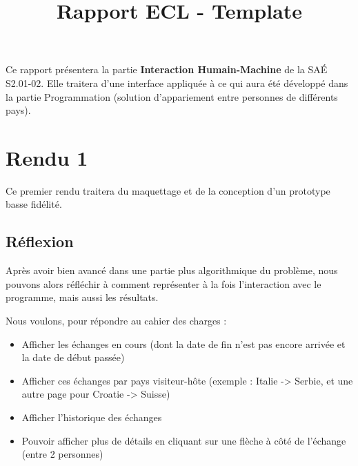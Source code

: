 \documentclass{mytex}
\title{Rapport ECL - Template} %
\begin{document}




        
\fairemarges %
\fairepagedegarde %
\tabledematieres %



Ce rapport présentera la partie \textbf{Interaction Humain-Machine} de la SAÉ S2.01-02. Elle traitera d'une interface appliquée à ce qui aura été développé dans la partie Programmation (solution d'appariement entre personnes de différents pays).

\section{Rendu 1}

Ce premier rendu traitera du maquettage et de la conception d'un prototype basse fidélité.

\subsection{Réflexion}

Après avoir bien avancé dans une partie plus algorithmique du problème, nous pouvons alors réfléchir à comment représenter à la fois l'interaction avec le programme, mais aussi les résultats.

Nous voulons, pour répondre au cahier des charges :

\begin{itemize}
	\item Afficher les échanges en cours (dont la date de fin n'est pas encore arrivée et la date de début passée)
	\item Afficher ces échanges par pays visiteur-hôte (exemple : Italie -> Serbie, et une autre page pour Croatie -> Suisse)
	\item Afficher l'historique des échanges
	\item Pouvoir afficher plus de détails en cliquant sur une flèche à côté de l'échange (entre 2 personnes)
\end{itemize}
\end{document}
